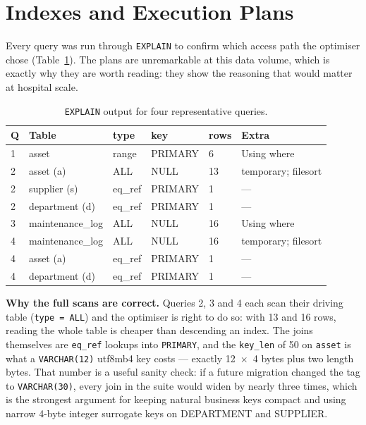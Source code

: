 \documentclass[conference]{IEEEtran}
\begin{document}
\section{Indexes and Execution Plans}
Every query was run through \texttt{EXPLAIN} to confirm which access path the
optimiser chose (Table~\ref{tab:explain}). The plans are unremarkable at this
data volume, which is exactly why they are worth reading: they show the
reasoning that would matter at hospital scale.

\begin{table}[!t]
\caption{\texttt{EXPLAIN} output for four representative queries.}
\label{tab:explain}
\footnotesize
\begin{tabular}{p{0.35cm}p{1.85cm}p{0.75cm}p{1.2cm}p{0.45cm}p{1.9cm}}
\toprule
\textbf{Q} & \textbf{Table} & \textbf{type} & \textbf{key} & \textbf{rows} & \textbf{Extra} \\
\midrule
1 & asset & range & PRIMARY & 6 & Using where \\
2 & asset (a) & ALL & NULL & 13 & temporary; filesort \\
2 & supplier (s) & eq\_ref & PRIMARY & 1 & --- \\
2 & department (d) & eq\_ref & PRIMARY & 1 & --- \\
3 & maintenance\_log & ALL & NULL & 16 & Using where \\
4 & maintenance\_log & ALL & NULL & 16 & temporary; filesort \\
4 & asset (a) & eq\_ref & PRIMARY & 1 & --- \\
4 & department (d) & eq\_ref & PRIMARY & 1 & --- \\
\bottomrule
\end{tabular}
\end{table}

\textbf{Why the full scans are correct.} Queries 2, 3 and 4 each scan their
driving table (\texttt{type = ALL}) and the optimiser is right to do so: with
13 and 16 rows, reading the whole table is cheaper than descending an index.
The joins themselves are \texttt{eq\_ref} lookups into \texttt{PRIMARY}, and
the \texttt{key\_len} of 50 on \texttt{asset} is what a \texttt{VARCHAR(12)}
utf8mb4 key costs --- exactly 12~$\times$~4 bytes plus two length bytes. That
number is a useful sanity check: if a future migration changed the tag to
\texttt{VARCHAR(30)}, every join in the suite would widen by nearly three
times, which is the strongest argument for keeping natural business keys
compact and using narrow 4-byte integer surrogate keys on DEPARTMENT and
SUPPLIER.
\end{document}
